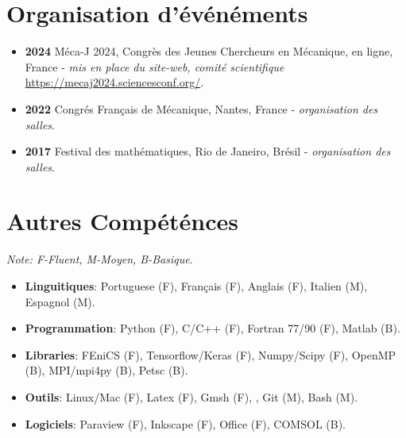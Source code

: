 \documentclass[french]{article}
\begin{document}
\section*{Organisation d'événéments}
\begin{itemize}
\item \textbf{2024} Méca-J 2024, Congrès des Jeunes Chercheurs en Mécanique, en ligne, France - \textit{mis en place du site-web, comité scientifique} \url{https://mecaj2024.sciencesconf.org/}.
\item \textbf{2022} Congrés Français de Mécanique, Nantes, France - \textit{organisation des salles}.
\item \textbf{2017} Festival des mathématiques, Rio de Janeiro, Brésil - \textit{organisation des salles}.
\end{itemize}

\section*{Autres Compéténces}
\textit{Note: F-Fluent, M-Moyen, B-Basique}. 
\begin{itemize}
\item \textbf{Linguitiques}: Portuguese (F), Français (F), Anglais (F), Italien (M), Espagnol (M).
\item \textbf{Programmation}: Python (F), C/C++ (F), Fortran 77/90 (F), Matlab (B).
\item \textbf{Libraries}: FEniCS (F), Tensorflow/Keras (F), Numpy/Scipy (F), OpenMP (B), MPI/mpi4py (B), Petsc (B). 
\item \textbf{Outils}: Linux/Mac (F), Latex (F), Gmsh (F), , Git (M), Bash (M). 
\item \textbf{Logiciels}: Paraview (F), Inkscape (F), Office (F), COMSOL (B).
\end{itemize}
\end{document}
